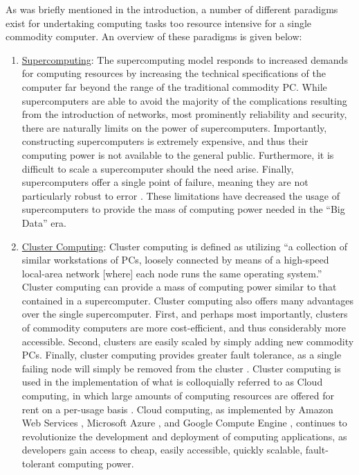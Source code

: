 As was briefly mentioned in the introduction, a number of different paradigms
exist for undertaking computing tasks too resource intensive for a single
commodity computer. An overview of these paradigms is given below:

\begin{enumerate}
  \item \underline{Supercomputing}: The supercomputing model responds to
    increased demands for computing resources by increasing the technical
    specifications of the computer far beyond the range of the
    traditional commodity PC.
    While supercomputers are able to avoid the majority of the complications
    resulting from the introduction of networks, most prominently reliability and
    security, there are naturally limits on the power of supercomputers.
    Importantly, constructing supercomputers is extremely expensive, and thus
    their computing power is not available to the general public. Furthermore,
    it is difficult to scale a supercomputer should the need arise. Finally,
    supercomputers offer a single point of failure, meaning they are not
    particularly robust to
    error \cite{cluster-computing-the-commodity-supercomputer}.
    These limitations have decreased the usage of
    supercomputers to provide the mass of computing power needed in the ``Big
    Data'' era.

  \item \underline{Cluster Computing}: Cluster computing is defined as utilizing
    ``a collection of similar workstations of PCs, loosely connected by means of
    a high-speed local-area network [where] each node runs the same operating
    system.''\cite{distributed-systems-principles-and-paradigms}
    Cluster computing can provide a mass of computing power similar to
    that contained in a supercomputer. Cluster computing also offers many
    advantages over the single supercomputer. First, and perhaps most
    importantly, clusters of commodity computers are
    more cost-efficient, and thus considerably more
    accessible. Second, clusters are easily scaled
    by simply adding new commodity PCs.
    Finally, cluster computing provides greater fault
    tolerance, as a single failing node will simply be removed
    from the cluster \cite{cluster-based-scalable-network-services}.
    Cluster computing is used in the
    implementation of what is colloquially referred to as Cloud
    computing, in which large amounts of computing resources are offered for
    rent on a per-usage basis \cite{distributed-systems-concepts-and-design}.
    Cloud computing, as implemented by Amazon Web
    Services \cite{amazon-web-services}, Microsoft Azure \cite{microsoft-azure},
    and Google Compute Engine \cite{google-compute-engine}, continues to
    revolutionize the development and deployment of computing applications, as
    developers gain access to cheap, easily accessible, quickly scalable,
    fault-tolerant computing power.


\end{enumerate}

